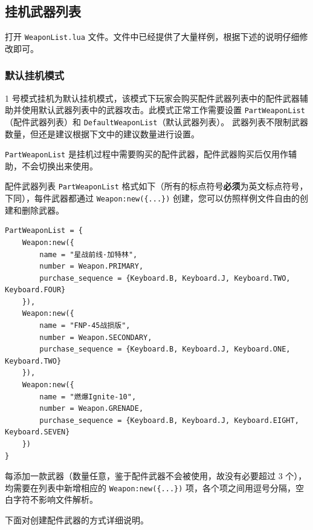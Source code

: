 \subsection{挂机武器列表}

打开 \lstinline{WeaponList.lua} 文件。文件中已经提供了大量样例，根据下述的说明仔细修改即可。

\subsubsection{默认挂机模式}

1 号模式挂机为默认挂机模式，该模式下玩家会购买配件武器列表中的配件武器辅助并使用默认武器列表中的武器攻击。此模式正常工作需要设置 \lstinline{PartWeaponList}（配件武器列表）和 \lstinline{DefaultWeaponList}（默认武器列表）。
武器列表不限制武器数量，但还是建议根据下文中的建议数量进行设置。

\lstinline{PartWeaponList} 是挂机过程中需要购买的配件武器，配件武器购买后仅用作辅助，不会切换出来使用。

配件武器列表 \lstinline{PartWeaponList} 格式如下（所有的标点符号\textbf{\color{red}必须}为英文标点符号，下同），每件武器都通过 \lstinline|Weapon:new({...})| 创建，您可以仿照样例文件自由的创建和删除武器。

\begin{verbatim}
PartWeaponList = {
    Weapon:new({
        name = "星战前线·加特林",
        number = Weapon.PRIMARY,
        purchase_sequence = {Keyboard.B, Keyboard.J, Keyboard.TWO, Keyboard.FOUR}
    }),
    Weapon:new({
        name = "FNP-45战损版",
        number = Weapon.SECONDARY,
        purchase_sequence = {Keyboard.B, Keyboard.J, Keyboard.ONE, Keyboard.TWO}
    }),
    Weapon:new({
        name = "燃爆Ignite-10",
        number = Weapon.GRENADE,
        purchase_sequence = {Keyboard.B, Keyboard.J, Keyboard.EIGHT, Keyboard.SEVEN}
    })
}
\end{verbatim}

每添加一款武器（数量任意，鉴于配件武器不会被使用，故没有必要超过 3 个），均需要在列表中新增相应的 \lstinline|Weapon:new({...})| 项，各个项之间用逗号分隔，空白字符不影响文件解析。

下面对创建配件武器的方式详细说明。

